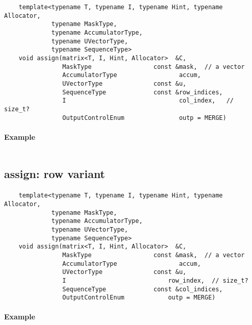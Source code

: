 \begin{verbatim}
    template<typename T, typename I, typename Hint, typename Allocator,
             typename MaskType,
             typename AccumulatorType,
             typename UVectorType,
             typename SequenceType>
    void assign(matrix<T, I, Hint, Allocator>  &C,
                MaskType                 const &mask,  // a vector
                AccumulatorType                 accum,
                UVectorType              const &u,
                SequenceType             const &row_indices,
                I                               col_index,   // size_t?
                OutputControlEnum               outp = MERGE)
\end{verbatim}


\paragraph{Example}

\begin{verbatim}

\end{verbatim}


\subsection{{\sf assign}: row variant}

\paragraph{\syntax}

\begin{verbatim}
    template<typename T, typename I, typename Hint, typename Allocator,
             typename MaskType,
             typename AccumulatorType,
             typename UVectorType,
             typename SequenceType>
    void assign(matrix<T, I, Hint, Allocator>  &C,
                MaskType                 const &mask,  // a vector
                AccumulatorType                 accum,
                UVectorType              const &u,
                I                            row_index,  // size_t?
                SequenceType             const &col_indices,
                OutputControlEnum            outp = MERGE)
\end{verbatim}


\paragraph{Example}

